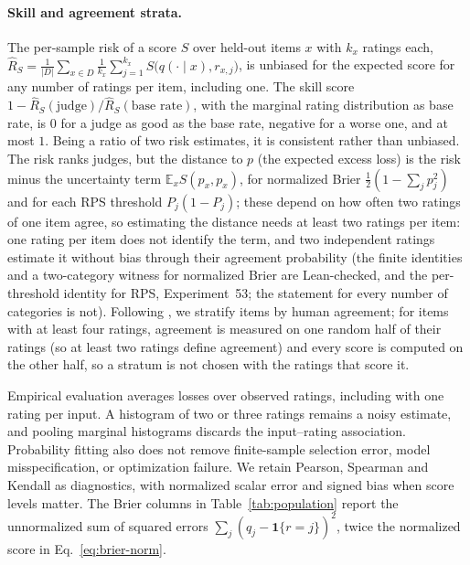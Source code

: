 \paragraph{Skill and agreement strata.}
The per-sample risk of a score $S$ over held-out items $x$ with $k_x$ ratings each, $\hat R_S=\frac1{|D|}\sum_{x\in D}\frac1{k_x}\sum_{j=1}^{k_x}S\big(q(\cdot\mid x),r_{x,j}\big)$, is unbiased for the expected score for any number of ratings per item, including one.
The skill score~\citep{murphy1989skill} $1-\hat R_S(\text{judge})/\hat R_S(\text{base rate})$, with the marginal rating distribution as base rate, is $0$ for a judge as good as the base rate, negative for a worse one, and at most $1$.
Being a ratio of two risk estimates, it is consistent rather than unbiased.
The risk ranks judges, but the distance to $p$ (the expected excess loss) is the risk minus the uncertainty term $\mathbb{E}_x S(p_x,p_x)$, for normalized Brier $\frac12(1-\sum_j p_j^2)$ and for each RPS threshold $P_j(1-P_j)$; these depend on how often two ratings of one item agree, so estimating the distance needs at least two ratings per item: one rating per item does not identify the term, and two independent ratings estimate it without bias through their agreement probability (the finite identities and a two-category witness for normalized Brier are Lean-checked, and the per-threshold identity for RPS, Experiment~53; the statement for every number of categories is not).
Following \citet{elangovan2025beyond}, we stratify items by human agreement; for items with at least four ratings, agreement is measured on one random half of their ratings (so at least two ratings define agreement) and every score is computed on the other half, so a stratum is not chosen with the ratings that score it.

Empirical evaluation averages losses over observed ratings, including with one rating per input.
A histogram of two or three ratings remains a noisy estimate, and pooling marginal histograms discards the input--rating association.
Probability fitting also does not remove finite-sample selection error, model misspecification, or optimization failure.
We retain Pearson, Spearman and Kendall as diagnostics, with normalized scalar error and signed bias when score levels matter.
The Brier columns in Table~\ref{tab:population} report the unnormalized sum of squared errors $\sum_j(q_j-\mathbf{1}\{r=j\})^2$, twice the normalized score in Eq.~\ref{eq:brier-norm}.
